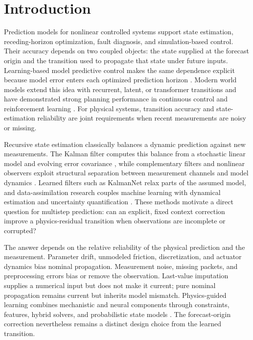 \section{Introduction}

Prediction models for nonlinear controlled systems support state estimation,
receding-horizon optimization, fault diagnosis, and simulation-based control.
Their accuracy depends on two coupled objects: the state supplied at the
forecast origin and the transition used to propagate that state under future
inputs. Learning-based model predictive control makes the same dependence
explicit because model error enters each optimized prediction horizon
\cite{hewing2020_learning_mpc}. Modern world models extend this idea with
recurrent, latent, or transformer transitions and have demonstrated strong
planning performance in continuous control and reinforcement learning
\cite{hafner2025_mastering_diverse_control_tasks_through,hansen2023_td_mpc2_scalable_robust_world,micheli2022_transformers_are_sample_efficient_world,zhang2023_storm_efficient_stochastic_transformer_based}.
For physical systems, transition accuracy and state-estimation reliability are
joint requirements when recent measurements are noisy or missing.

Recursive state estimation classically balances a dynamic prediction against
new measurements. The Kalman filter computes this balance from a stochastic
linear model and evolving error covariance \cite{kalman1960_filtering}, while
complementary filters and nonlinear observers exploit structural separation
between measurement channels and model dynamics
\cite{mahony2008_complementary,zhao2023_wheel_rail_observer}. Learned filters
such as KalmanNet relax parts of the assumed model, and data-assimilation
research couples machine learning with dynamical estimation and uncertainty
quantification
\cite{revach2022_kalmannet,cheng2023_machine_learning_with_data_assimilation}.
These methods motivate a direct question for multistep prediction: can an
explicit, fixed context correction improve a physics-residual transition when
observations are incomplete or corrupted?

The answer depends on the relative reliability of the physical prediction and
the measurement. Parameter drift, unmodeled friction, discretization, and
actuator dynamics bias nominal propagation. Measurement noise, missing packets,
and preprocessing errors bias or remove the observation. Last-value imputation
supplies a numerical input but does not make it current; pure nominal
propagation remains current but inherits model mismatch. Physics-guided
learning combines mechanistic and neural components through constraints,
features, hybrid solvers, and probabilistic state models
\cite{karniadakis2021_physics_informed_machine_learning,willard2022_integrating_scientific_knowledge_with_machine,yu2024_learning_dynamical_systems_from_data,shen2023_differentiable_modelling_to_unify_machine}.
The forecast-origin correction nevertheless remains a distinct design choice
from the learned transition.

